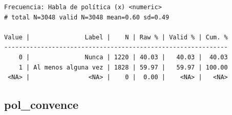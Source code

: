 \documentclass[
  letterpaper,
  DIV=11,
  numbers=noendperiod]{scrreprt}
\newenvironment{Shaded}{\begin{snugshade}}{\end{snugshade}}
\newcommand{\AttributeTok}[1]{\textcolor[rgb]{0.40,0.45,0.13}{#1}}
\newcommand{\CommentTok}[1]{\textcolor[rgb]{0.37,0.37,0.37}{#1}}
\newcommand{\ConstantTok}[1]{\textcolor[rgb]{0.56,0.35,0.01}{#1}}
\newcommand{\DecValTok}[1]{\textcolor[rgb]{0.68,0.00,0.00}{#1}}
\newcommand{\FunctionTok}[1]{\textcolor[rgb]{0.28,0.35,0.67}{#1}}
\newcommand{\NormalTok}[1]{\textcolor[rgb]{0.00,0.23,0.31}{#1}}
\newcommand{\OtherTok}[1]{\textcolor[rgb]{0.00,0.23,0.31}{#1}}
\newcommand{\SpecialCharTok}[1]{\textcolor[rgb]{0.37,0.37,0.37}{#1}}
\newcommand{\StringTok}[1]{\textcolor[rgb]{0.13,0.47,0.30}{#1}}
\begin{document}
\begin{Shaded}
\end{Shaded}

\begin{verbatim}
Frecuencia: Habla de política (x) <numeric> 
# total N=3048 valid N=3048 mean=0.60 sd=0.49

Value |               Label |    N | Raw % | Valid % | Cum. %
-------------------------------------------------------------
    0 |               Nunca | 1220 | 40.03 |   40.03 |  40.03
    1 | Al menos alguna vez | 1828 | 59.97 |   59.97 | 100.00
 <NA> |                <NA> |    0 |  0.00 |    <NA> |   <NA>
\end{verbatim}

\hypertarget{pol_convence}{%
\subsection{pol\_convence}\label{pol_convence}}
\end{document}
